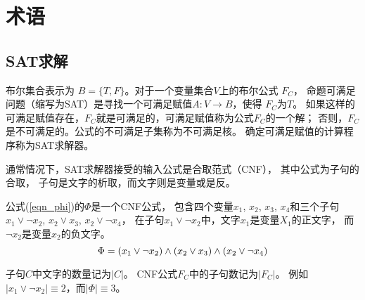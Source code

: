 \section{术语}

\subsection{SAT求解}
布尔集合表示为 $B=\{T,F\}$。对于一个变量集合$V$上的布尔公式 $F_C$，
命题可满足问题（缩写为SAT）是寻找一个可满足赋值$A : V\to B$，使得 $F_C$为$T$。
如果这样的可满足赋值存在，$F_C$就是可满足的，可满足赋值称为公式$F_C$的一个解；
否则，$F_C$是不可满足的。公式的不可满足子集称为不可满足核。
确定可满足赋值的计算程序称为SAT求解器\cite{Minisat}。

通常情况下，SAT求解器接受的输入公式是合取范式（CNF），
其中公式为子句的合取，
子句是文字的析取，而文字则是变量或是反。

公式(\ref{eqn_phi})的$\Phi$是一个CNF公式，
包含四个变量$x_1$, $x_2$, $x_3$, $x_4$和三个子句 $x_1\vee \neg x_2$, $x_2\vee x_3$, $x_2\vee \neg x_4$，
在子句$x_1\vee \neg x_2$中，文字$x_1$是变量$X_1$的正文字，
而$\neg x_2$是变量$x_2$的负文字。
\begin{equation}\label{eqn_phi}
\centering \Phi=(x_1\vee \neg x_2)
\wedge(x_2\vee x_3)
\wedge(x_2\vee \neg x_4)
\end{equation}

子句$C$中文字的数量记为$|C|$。
CNF公式$F_C$中的子句数记为$|F_C|$。
例如$| x_1\vee  \neg x_2 |\equiv 2$，而$|\Phi|\equiv 3$。

